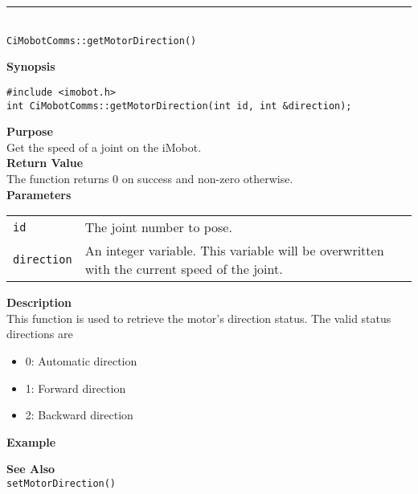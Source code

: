 \noindent
\vspace{5pt}
\rule{4.5in}{0.015in}\\
\noindent
{\LARGE \texttt{CiMobotComms::getMotorDirection()}}\\
{}

\noindent
{\bf Synopsis}\\
\begin{verbatim}
#include <imobot.h>
int CiMobotComms::getMotorDirection(int id, int &direction);
\end{verbatim}

\noindent
{\bf Purpose}\\
Get the speed of a joint on the iMobot.\\

\noindent
{\bf Return Value}\\
The function returns 0 on success and non-zero otherwise.\\

\noindent
{\bf Parameters}
\vspace{-0.1in}
\begin{description}
\item               
\begin{tabular}{p{10 mm}p{145 mm}}
\texttt{id} & The joint number to pose. \\
\texttt{direction} & An integer variable. This variable will be overwritten
with the current speed of the joint.
\end{tabular}
\end{description}

\noindent
{\bf Description}\\
This function is used to retrieve the motor's direction status. The valid
status directions are
\begin{itemize}
\item 0: Automatic direction
\item 1: Forward direction
\item 2: Backward direction
\end{itemize}

\noindent
{\bf Example}\\
\noindent

\noindent
{\bf See Also}\\
\texttt{setMotorDirection()}

